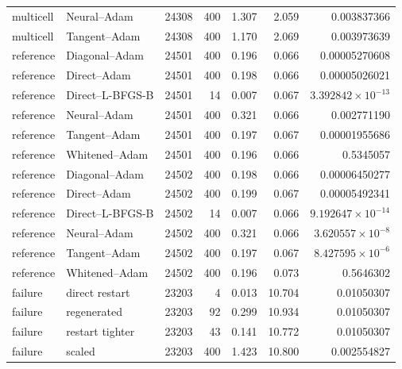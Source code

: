 \begin{longtable}{llrrrrr}
multicell & Neural--Adam & 24308 & 400 & 1.307 & 2.059 & 0.003837366\\
multicell & Tangent--Adam & 24308 & 400 & 1.170 & 2.069 & 0.003973639\\
reference & Diagonal--Adam & 24501 & 400 & 0.196 & 0.066 & 0.00005270608\\
reference & Direct--Adam & 24501 & 400 & 0.198 & 0.066 & 0.00005026021\\
reference & Direct--L-BFGS-B & 24501 & 14 & 0.007 & 0.067 & $3.392842\times10^{-13}$\\
reference & Neural--Adam & 24501 & 400 & 0.321 & 0.066 & 0.002771190\\
reference & Tangent--Adam & 24501 & 400 & 0.197 & 0.067 & 0.00001955686\\
reference & Whitened--Adam & 24501 & 400 & 0.196 & 0.066 & 0.5345057\\
reference & Diagonal--Adam & 24502 & 400 & 0.198 & 0.066 & 0.00006450277\\
reference & Direct--Adam & 24502 & 400 & 0.199 & 0.067 & 0.00005492341\\
reference & Direct--L-BFGS-B & 24502 & 14 & 0.007 & 0.066 & $9.192647\times10^{-14}$\\
reference & Neural--Adam & 24502 & 400 & 0.321 & 0.066 & $3.620557\times10^{-8}$\\
reference & Tangent--Adam & 24502 & 400 & 0.197 & 0.067 & $8.427595\times10^{-6}$\\
reference & Whitened--Adam & 24502 & 400 & 0.196 & 0.073 & 0.5646302\\
failure & direct restart & 23203 & 4 & 0.013 & 10.704 & 0.01050307\\
failure & regenerated & 23203 & 92 & 0.299 & 10.934 & 0.01050307\\
failure & restart tighter & 23203 & 43 & 0.141 & 10.772 & 0.01050307\\
failure & scaled & 23203 & 400 & 1.423 & 10.800 & 0.002554827\\
\bottomrule\end{longtable}\normalsize
